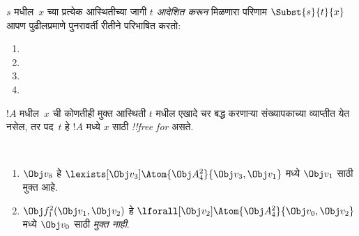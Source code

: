 \documentclass[../../../include/open-logic-section]{subfiles}
\begin{document}


\begin{defn}[पदातील आदेशन]
$s$ मधील~$x$ च्या प्रत्येक आस्थितीच्या जागी $t$ \emph{आदेशित करून}
मिळणारा परिणाम $\Subst{s}{t}{x}$ आपण पुढीलप्रमाणे पुनरावर्ती रीतीने
परिभाषित करतो:
\begin{enumerate}
\item {}

\item {}

\item {}

\item{}
\end{enumerate}
\end{defn}

\begin{defn}
$!A$ मधील~$x$ ची कोणतीही मुक्त आस्थिती $t$ मधील एखादे चर बद्ध करणाऱ्या
संख्यापकाच्या व्याप्तीत येत नसेल, तर पद~$t$ हे $!A$ मध्ये $x$ साठी
\emph{!!{free for}} असते.
\end{defn}

\begin{ex} ~
\begin{enumerate}
\item $\Obj v_8$ हे $\lexists[\Obj
  v_3]\Atom{\Obj A^2_4}{\Obj v_3,\Obj v_1}$ मध्ये $\Obj v_1$ साठी
  मुक्त आहे.

\item $\Obj f^2_1(\Obj v_1, \Obj v_2)$ हे
  $\lforall[\Obj v_2]\Atom{\Obj A^2_4}{\Obj v_0,\Obj v_2}$ मध्ये
  $\Obj v_0$ साठी \emph{मुक्त नाही}.
\end{enumerate}
\end{ex}
\end{document}
